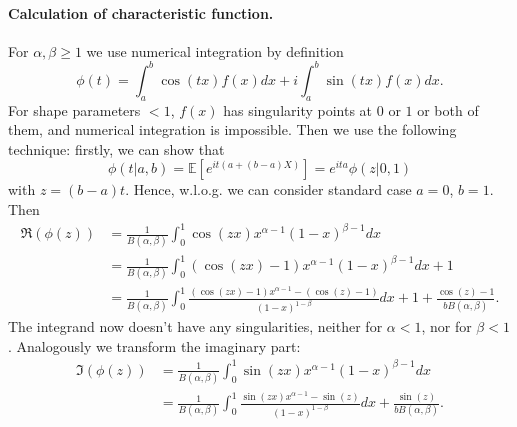 \documentclass[a4paper,11pt]{article}
\theoremstyle{plain}
\theoremstyle{definition}
\newcommand{\ME}{\mathbb{E}}
\begin{document}
	\paragraph{Calculation of characteristic function.}
	For $\alpha, \beta \geq 1$ we use numerical integration by definition
	\[
	\phi(t) = \int_a^b \cos(tx) f(x) dx + i \int_{a}^{b} \sin(tx) f(x) dx.
	\]
	For shape parameters $<1$, $f(x)$ has singularity points at $0$ or $1$ or both of them, and numerical integration is impossible. Then we use the following technique: firstly, we can show that
	\[
	\phi(t|a, b) = \ME[e^{it(a + (b-a)X)}] = e^{ita} \phi(z|0, 1)
	\]
	with $z = (b-a)t$. Hence, w.l.o.g. we can consider standard case $a=0$, $b=1$. Then
	\[
	\begin{aligned}
	\Re(\phi(z)) & = \frac{1}{B(\alpha, \beta)} \int_{0}^{1} \cos(zx) x^{\alpha-1} (1-x)^{\beta-1} dx\\
	& = \frac{1}{B(\alpha, \beta)} \int_{0}^{1} (\cos(zx)-1) x^{\alpha-1} (1-x)^{\beta-1} dx + 1 \\
	& = \frac{1}{B(\alpha, \beta)} \int_{0}^{1} \frac{(\cos(zx)-1) x^{\alpha-1} - (\cos(z)-1)}{(1-x)^{1-\beta}}  dx + 1 + \frac{\cos(z) - 1}{bB(\alpha, \beta)}.
	\end{aligned}
	\]
	The integrand now doesn't have any singularities, neither for $\alpha<1$, nor for $\beta < 1$. Analogously we transform the imaginary part:
	\[
	\begin{aligned}
	\Im(\phi(z)) & = \frac{1}{B(\alpha, \beta)} \int_{0}^{1} \sin(zx) x^{\alpha-1} (1-x)^{\beta-1} dx\\
	& = \frac{1}{B(\alpha, \beta)} \int_{0}^{1} \frac{\sin(zx) x^{\alpha-1} - \sin(z)}{(1-x)^{1-\beta}}  dx + \frac{\sin(z)}{bB(\alpha, \beta)}.
	\end{aligned}
	\]
	
\end{document}
